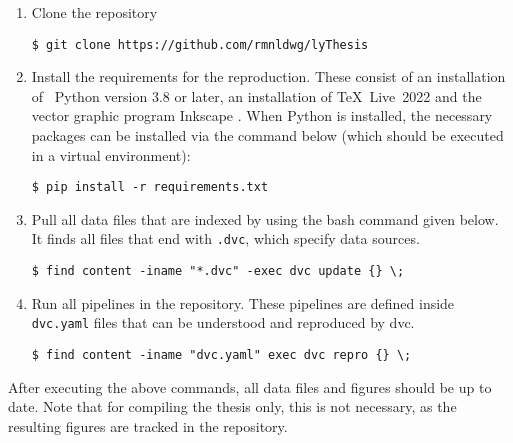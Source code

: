 \documentclass[\relativeRoot/main.tex]{subfiles}
\begin{document}
\begin{enumerate}[label={(\arabic*)}]
    \item Clone the  repository
    \begin{verbatim}$ git clone https://github.com/rmnldwg/lyThesis\end{verbatim}
    
    \item Install the requirements for the reproduction. These consist of an installation of ~Python version 3.8 or later, an installation of \TeX~Live~2022 and the vector graphic program  Inkscape \cite{noauthor_inkscape_2022}. When Python is installed, the necessary packages can be installed via the command below (which should be executed in a virtual environment):
    \begin{verbatim}$ pip install -r requirements.txt\end{verbatim}
    
    \item Pull all data files that are indexed by  \cite{noauthor_data_2022} using the bash command given below. It finds all files that end with \texttt{.dvc}, which specify data sources.
    \begin{verbatim}$ find content -iname "*.dvc" -exec dvc update {} \;\end{verbatim}
    
    \item Run all pipelines in the repository. These pipelines are defined inside \texttt{dvc.yaml} files that can be understood and reproduced by \acrlong{dvc}.
    \begin{verbatim}$ find content -iname "dvc.yaml" exec dvc repro {} \;\end{verbatim}
\end{enumerate}

After executing the above commands, all data files and figures should be up to date. Note that for compiling the thesis only, this is not necessary, as the resulting figures are tracked in the  repository. 
\end{document}
